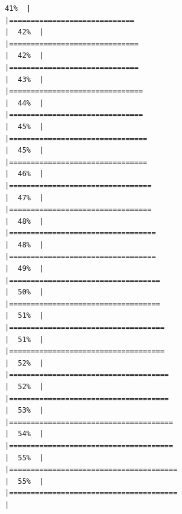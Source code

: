\documentclass[
  english,
  man,a4paper,mask,floatsintext]{apa6}
\begin{document}
\begin{verbatim}
41%  |                                                                              |=============================                                         |  42%  |                                                                              |==============================                                        |  42%  |                                                                              |==============================                                        |  43%  |                                                                              |===============================                                       |  44%  |                                                                              |===============================                                       |  45%  |                                                                              |================================                                      |  45%  |                                                                              |================================                                      |  46%  |                                                                              |=================================                                     |  47%  |                                                                              |=================================                                     |  48%  |                                                                              |==================================                                    |  48%  |                                                                              |==================================                                    |  49%  |                                                                              |===================================                                   |  50%  |                                                                              |===================================                                   |  51%  |                                                                              |====================================                                  |  51%  |                                                                              |====================================                                  |  52%  |                                                                              |=====================================                                 |  52%  |                                                                              |=====================================                                 |  53%  |                                                                              |======================================                                |  54%  |                                                                              |======================================                                |  55%  |                                                                              |=======================================                               |  55%  |                                                                              |=======================================                               |  
\end{verbatim}
\end{document}
